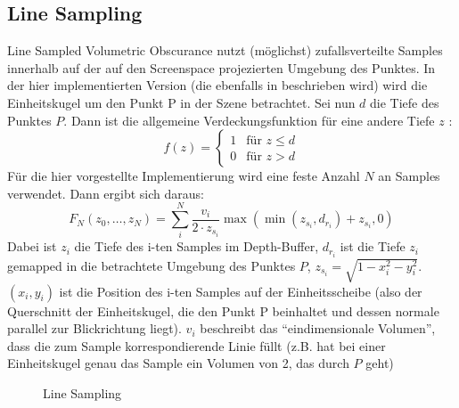 \documentclass[runningheaders,a4paper]{llncs}
\begin{document}
\subsection{Line Sampling}
Line Sampled Volumetric Obscurance nutzt (möglichst) zufallsverteilte Samples innerhalb auf der auf den
Screenspace projezierten Umgebung des Punktes. In der hier implementierten Version (die ebenfalls in
\cite{voPaper} beschrieben wird) wird die Einheitskugel um den Punkt P in der Szene betrachtet.
Sei nun $d$ die Tiefe des Punktes $P$. Dann ist die allgemeine Verdeckungsfunktion für eine andere Tiefe
$z$ :
$$
f(z) = \begin{cases} 1 &  \text{für } z \leq d \\ 0 & \text{für } z > d \end{cases}
$$
Für die hier vorgestellte Implementierung wird eine feste Anzahl $N$ an Samples verwendet.
Dann ergibt sich daraus:
$$
F_{N}(z_0, \dots, z_N) = \sum_i^N \frac{v_i}{2 \cdot z_{s_i}} \max{(\min{(z_{s_i}, d_{r_i})} + z_{s_i}, 0)}
$$
Dabei ist $z_i$ die Tiefe des i-ten Samples im Depth-Buffer, $d_{r_i}$ ist die Tiefe $z_i$ gemapped in die
betrachtete Umgebung des Punktes $P$, $z_{s_i} = \sqrt{1 - x_i^2 - y_i^2}$. $(x_i, y_i)$ ist die Position des
i-ten Samples auf der Einheitsscheibe (also der Querschnitt der Einheitskugel, die den Punkt P 
beinhaltet und dessen normale parallel zur Blickrichtung liegt). $v_i$ beschreibt das ``eindimensionale
Volumen'', dass die zum Sample korrespondierende Linie füllt (z.B. hat bei einer Einheitskugel genau das Sample
ein Volumen von 2, das durch $P$ geht) \newline

\begin{figure}
	\centering

	
	\label{ref:lineSample}

	\caption{Line Sampling}
\end{figure}
\end{document}
